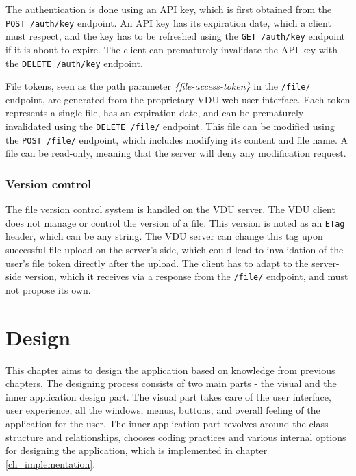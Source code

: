 The authentication is done using an API key, which is first obtained from the \lstinline{POST /auth/key} endpoint. An API key has its expiration date, which a client must respect, and the key has to be refreshed using the \lstinline{GET /auth/key} endpoint if it is about to expire. The client can prematurely invalidate the API key with the \lstinline{DELETE /auth/key} endpoint.

File tokens, seen as the path parameter \textit{\{file-access-token\}} in the \lstinline{/file/} endpoint, are generated from the proprietary VDU web user interface. Each token represents a single file, has an expiration date, and can be prematurely invalidated using the \lstinline{DELETE /file/} endpoint. This file can be modified using the \lstinline{POST /file/} endpoint, which includes modifying its content and file name. A file can be read-only, meaning that the server will deny any modification request.

\subsection{Version control}
The file version control system is handled on the VDU server. The VDU client does not manage or control the version of a file. This version is noted as an \lstinline{ETag} header, which can be any string. The VDU server can change this tag upon successful file upload on the server's side, which could lead to invalidation of the user's file token directly after the upload. The client has to adapt to the server-side version, which it receives via a response from the \lstinline{/file/} endpoint, and must not propose its own.


\chapter{Design}
\label{ch_design}
This chapter aims to design the application based on knowledge from previous chapters. The designing process consists of two main parts - the visual and the inner application design part. The visual part takes care of the user interface, user experience, all the windows, menus, buttons, and overall feeling of the application for the user. The inner application part revolves around the class structure and relationships, chooses coding practices and various internal options for designing the application, which is implemented in chapter \ref{ch_implementation}.

